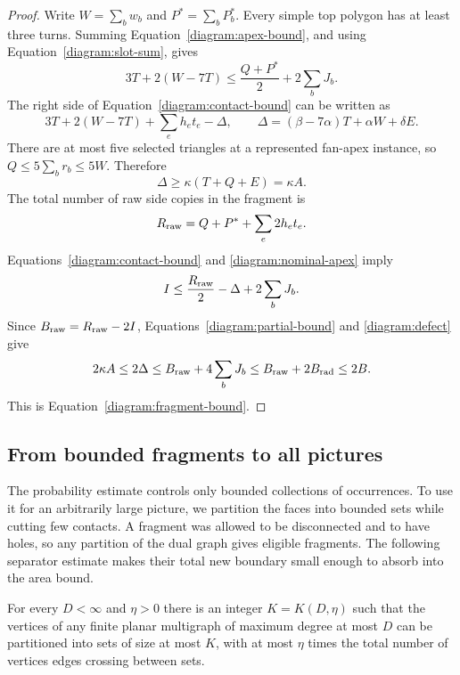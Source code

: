 \begin{proof}
Write $W=\sum_b w_b$ and $P^*=\sum_bP_b^*$.  Every simple top polygon
has at least three turns.  Summing
Equation~\eqref{diagram:apex-bound}, and using
Equation~\eqref{diagram:slot-sum}, gives
\begin{equation}\label{diagram:nominal-apex}
 3T+2(W-7T)\le \frac{Q+P^*}{2}+2\sum_bJ_b.
\end{equation}
The right side of Equation~\eqref{diagram:contact-bound} can be written
as
\[
 3T+2(W-7T)+\sum_eh_et_e-\Delta,
 \qquad
 \Delta=(\beta-7\alpha)T+\alpha W+\delta E.
\]
There are at most five selected triangles at a represented fan-apex
instance, so
$Q\le5\sum_b r_b\le5W$.  Therefore
\begin{equation}\label{diagram:defect}
 \Delta\ge\kappa(T+Q+E)=\kappa A.
\end{equation}
The total number of raw side copies in the fragment is
\[
 R_{\rm raw}=Q+P^*+\sum_e2h_et_e.
\]
Equations~\eqref{diagram:contact-bound} and
\eqref{diagram:nominal-apex} imply
\[
 I\le \frac{R_{\rm raw}}2-\Delta+2\sum_bJ_b.
\]
Since $B_{\rm raw}=R_{\rm raw}-2I$,
Equations~\eqref{diagram:partial-bound} and
\eqref{diagram:defect} give
\[
 2\kappa A\le 2\Delta
       \le B_{\rm raw}+4\sum_bJ_b
       \le B_{\rm raw}+2B_{\rm rad}\le2B.
\]
This is Equation~\eqref{diagram:fragment-bound}.
\end{proof}

\subsection{From bounded fragments to all pictures}

The probability estimate controls only bounded collections of
occurrences. To use it for an arbitrarily large picture, we partition
the faces into bounded sets while cutting few contacts. A fragment
was allowed to be disconnected and to have holes, so any partition
of the dual graph gives eligible fragments. The following separator
estimate makes their total new boundary small enough to absorb into
the area bound.

\begin{lemma}\label{diagram:separator}
For every $D<\infty$ and $\eta>0$ there is an integer $K=K(D,\eta)$
such that the vertices of any finite planar multigraph of maximum
degree at most $D$ can be partitioned into sets of size at most $K$,
with at most $\eta$ times the total number of vertices edges crossing
between sets.
\end{lemma}

